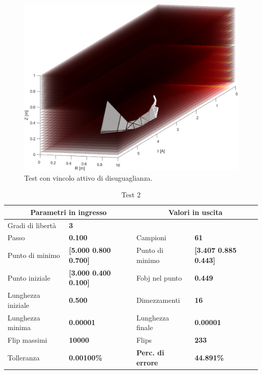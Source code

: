 \documentclass[a4paper, 11pt]{article}
\begin{document}
\begin{figure}[H]
    \centering
        \includegraphics[width=14cm]{assets/figure7}
        \caption{Test con vincolo attivo di disuguaglianza.}
\end{figure}
    
\begin{table}[h]
    \caption{Test 2}
    \begin{center}
    \begin{tabular}{|l|l|l|l|} 
    \hline 
\multicolumn{2}{|c|}{\textbf{Parametri in ingresso}} &
\multicolumn{2}{c|}{\textbf {Valori in uscita}} \\ \hline
Gradi di libertà  & \textbf{3} &  &  \\ \hline 
Passo & \textbf{0.100} & Campioni & \textbf{61} \\ \hline 
Punto di minimo & \textbf{{[}5.000 0.800 0.700{]}} & Punto di minimo &
\textbf{{[}3.407 0.885 0.443{]}} \\ \hline 
Punto iniziale & \textbf{{[}3.000 0.400 0.100{]}} & Fobj nel punto &
\textbf{0.449} \\ \hline 
Lunghezza iniziale & \textbf{0.500} & Dimezzamenti & \textbf{16} \\ \hline 
Lunghezza minima & \textbf{0.00001} & Lunghezza finale & \textbf{0.00001} \\
\hline
Flip massimi & \textbf{10000} & Flips & \textbf{233} \\ \hline 
Tolleranza & \textbf{0.00100\%} & \textbf{Perc. di errore} & \textbf{44.891\%}
\\ \hline 
    \end{tabular}
    \end{center}
    \end{table}
\end{document}
